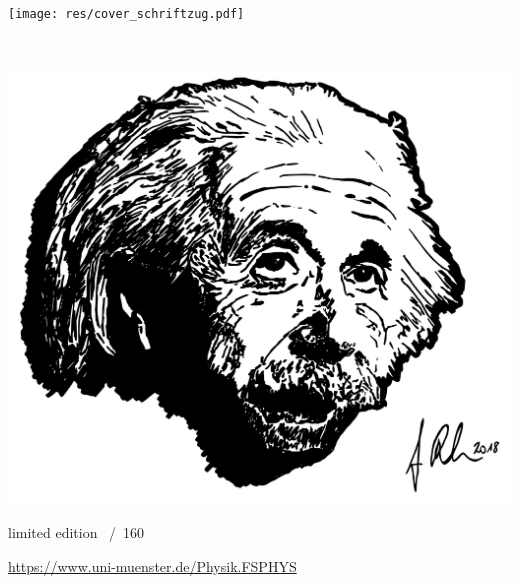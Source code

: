 \begin{titlepage}
	\begin{center}
		\vspace*{-1.25cm}
		{\LARGE
		\fibeltitel\par}

		\vspace{0.5cm}
		\texttt{[image: res/cover\_schriftzug.pdf]}

		{\huge
		\fibelsemester~\fibeljahr}

		\vspace{0.5cm}
		\includegraphics[width=\textwidth, height=0.53\textheight]{res/cover_einstein.pdf}
	\end{center}

	\LARGE
	limited edition \underline{\fontsize{32pt}{1em}}~/~160
	
	\vspace{1.9cm}
	\centering
	\url{https://www.uni-muenster.de/Physik.FSPHYS}
\end{titlepage}

